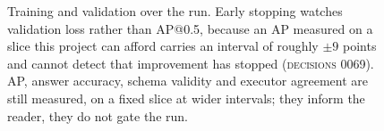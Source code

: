 \begin{figure}[t]
\centering
\caption{Training and validation over the run. Early stopping watches validation loss rather than AP@0.5, because an AP measured on a slice this project can afford carries an interval of roughly $\pm 9$ points and cannot detect that improvement has stopped (\textsc{decisions} 0069). AP, answer accuracy, schema validity and executor agreement are still measured, on a fixed slice at wider intervals; they inform the reader, they do not gate the run.}
\label{fig:training_curves}
\end{figure}

